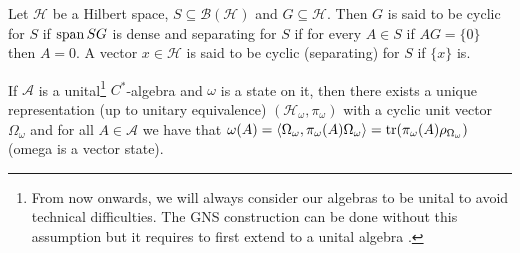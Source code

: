 \begin{definition}
Let $\mathcal{H}$ be a Hilbert space, $S\subseteq\mathcal{B}(\mathcal{H})$ and $G\subseteq\mathcal{H}$. Then $G$ is said to be cyclic for $S$ if $\operatorname{span} SG$ is dense and separating for $S$ if for every $A\in S$ if $AG=\{0\}$ then $A=0$. A vector $x\in\mathcal{H}$ is said to be cyclic (separating) for $S$ if $\{x\}$ is.
\end{definition}

\begin{theorem}
If $\mathcal{A}$ is a unital\footnote{From now onwards, we will always consider our algebras to be unital to avoid technical difficulties. The GNS construction can be done without this assumption but it requires to first extend to a unital algebra \cite{Bratteli1997}.} $C^*$-algebra and $\omega$ is a state on it, then there exists a unique representation (up to unitary equivalence) $(\mathcal{H}_\omega,\pi_\omega)$ with a cyclic unit vector $\Omega_\omega$ and for all $A\in\mathcal{A}$ we have that $\omega(A)=\langle\Omega_\omega,\pi_\omega(A)\Omega_\omega\rangle=\operatorname{tr}(\pi_\omega(A)\rho_{\Omega_\omega})$ (omega is a vector state).  
\end{theorem}

